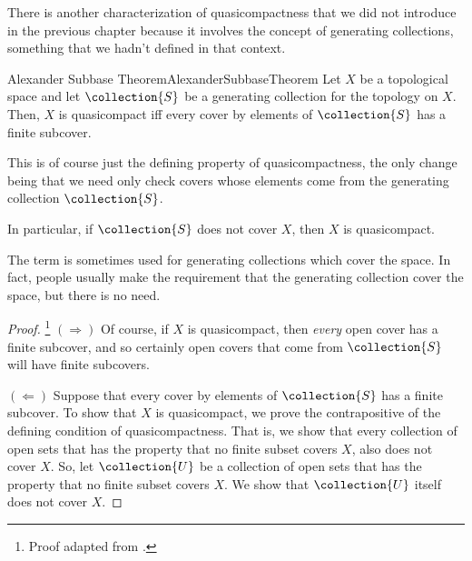 There is another characterization of quasicompactness that we did not introduce in the previous chapter because it involves the concept of generating collections, something that we hadn't defined in that context.
\begin{thm}{Alexander Subbase Theorem}{AlexanderSubbaseTheorem}
Let $X$ be a topological space and let $\collection{S}$ be a generating collection for the topology on $X$.  Then, $X$ is quasicompact iff every cover by elements of $\collection{S}$ has a finite subcover.
\begin{rmk}
This is of course just the defining property of quasicompactness, the only change being that we need only check covers whose elements come from the generating collection $\collection{S}$.
\end{rmk}
\begin{rmk}
In particular, if $\collection{S}$ does not cover $X$, then $X$ is quasicompact.
\end{rmk}
\begin{rmk}
The term  is sometimes used for generating collections which cover the space.  In fact, people usually make the requirement that the generating collection cover the space, but there is no need.
\end{rmk}
\begin{proof}\footnote{Proof adapted from \cite[pg.~139]{Kelley}.}
$(\Rightarrow )$ Of course, if $X$ is quasicompact, then \emph{every} open cover has a finite subcover, and so certainly open covers that come from $\collection{S}$ will have finite subcovers.

\blankline
\noindent
$(\Leftarrow )$ 
Suppose that every cover by elements of $\collection{S}$ has a finite subcover.  To show that $X$ is quasicompact, we prove the contrapositive of the defining condition of quasicompactness.  That is, we show that every collection of open sets that has the property that no finite subset covers $X$, also does not cover $X$.  So, let $\collection{U}$ be a collection of open sets that has the property that no finite subset covers $X$.  We show that $\collection{U}$ itself does not cover $X$.


\end{proof}
\end{thm}

